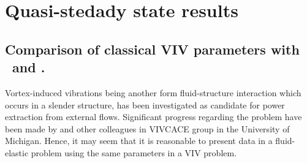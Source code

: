 \section{Quasi-stedady state results}

\subsection{Comparison of classical VIV parameters with \massstiff \ and \massdamp.}


Vortex-induced vibrations being another form fluid-structure interaction which occurs in a slender structure, has been investigated as candidate for power extraction from external flows. Significant progress regarding the problem have been made by \cite{Bernitsas2008a-concept,Bernitsas2009,Raghavan2010a,Lee2011b} and other colleagues in VIVCACE group in the University of Michigan. Hence, it may seem that it is reasonable to present data in a fluid-elastic problem using the same parameters in a VIV problem.












    


